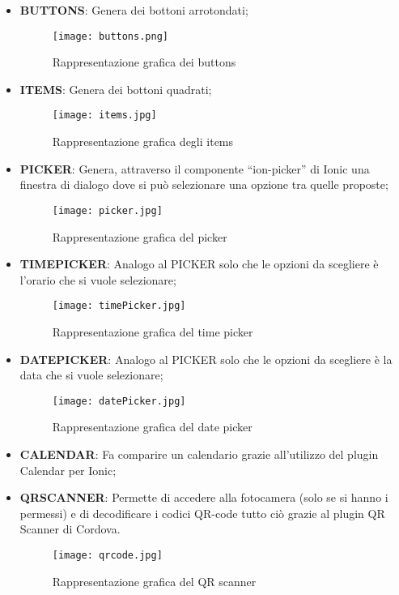 \begin{itemize}
	\item \textbf{BUTTONS}: Genera dei bottoni arrotondati;
	\begin{figure}[h]
		\centering
		\texttt{[image: buttons.png]}
	\caption{Rappresentazione grafica dei buttons}
	\end{figure}
	\clearpage
	\item \textbf{ITEMS}: Genera dei bottoni quadrati;
	\begin{figure}[h]
		\centering
		\texttt{[image: items.jpg]}
		\caption{Rappresentazione grafica degli items}
	\end{figure}
	\item \textbf{PICKER}: Genera, attraverso il componente “ion-picker” di \textsf{Ionic} una finestra di dialogo dove si può selezionare una opzione tra quelle proposte;
	\begin{figure}[h]
		\centering
		\texttt{[image: picker.jpg]}
		\caption{Rappresentazione grafica del picker}
	\end{figure}
	\item \textbf{TIMEPICKER}: Analogo al PICKER solo che le opzioni da scegliere è l'orario che si vuole selezionare;
	\begin{figure}[h]
		\centering
		\texttt{[image: timePicker.jpg]}
		\caption{Rappresentazione grafica del time picker}\label{fig:time}
	\end{figure}
\clearpage
	\item \textbf{DATEPICKER}: Analogo al PICKER solo che le opzioni da scegliere è la data che si vuole selezionare;
	\begin{figure}[h]
		\centering
		\texttt{[image: datePicker.jpg]}
		\caption{Rappresentazione grafica del date picker}\label{fig:date}
	\end{figure}
	\item \textbf{CALENDAR}: Fa comparire un calendario grazie all'utilizzo del plugin Calendar per Ionic;
	\item \textbf{QRSCANNER}: Permette di accedere alla fotocamera (solo se si hanno i permessi) e di decodificare i codici QR-code tutto ciò grazie al plugin QR Scanner di Cordova.
	\begin{figure}[h]
		\centering
		\texttt{[image: qrcode.jpg]}
		\caption{Rappresentazione grafica del QR scanner}\label{fig:qrc}
	\end{figure}
\end{itemize}

